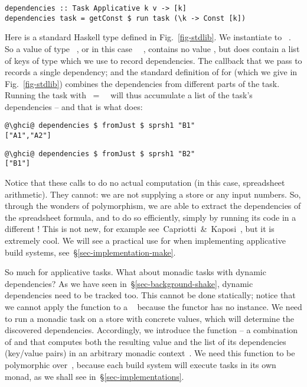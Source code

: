 \vspace{1mm}
\begin{verbatim}
dependencies :: Task Applicative k v -> [k]
dependencies task = getConst $ run task (\k -> Const [k])
\end{verbatim}
\vspace{1mm}

\noindent
Here  is a standard Haskell type defined in Fig.~\ref{fig-stdlib}. We
instantiate  to ~\hs{[@@k]}. So a value of type ~,
or in this case ~\hs{[@@k]}~, contains no value , but does
contain a list of keys of type \hs{[@@k]} which we use to record dependencies.
The  callback that we pass to  records a single dependency;
and the standard definition of  for  (which we give
in Fig.~\ref{fig-stdlib}) combines the dependencies from different parts of the
task. Running the task with ~=~~\hs{[@@k]} will thus
accumulate a list of the task's dependencies -- and that is what
 does:
\vspace{1mm}
\begin{verbatim}
@\ghci@ dependencies $ fromJust $ sprsh1 "B1"
["A1","A2"]
\end{verbatim}
\begin{verbatim}
@\ghci@ dependencies $ fromJust $ sprsh1 "B2"
["B1"]
\end{verbatim}
\vspace{1mm}

\noindent
Notice that these calls to  do no actual computation (in this
case, spreadsheet arithmetic). They cannot: we are not supplying a store or any
input numbers. So, through the wonders of polymorphism, we are able to extract
the dependencies of the spreadsheet formula, and to do so efficiently, simply by
running its code in a different ! This is not new, for example
see~Capriotti~\&~Kaposi~, but it is extremely cool.
We will see a practical use for  when implementing applicative
build systems, see~\S\ref{sec-implementation-make}.

So much for applicative tasks. What about monadic tasks with dynamic
dependencies? As we have seen in~\S\ref{sec-background-shake}, dynamic
dependencies need to be tracked too. This cannot be done statically; notice that
we cannot apply the function  to a ~ because
the  functor has no  instance. We need to run a monadic task
on a store with concrete values, which will determine the discovered
dependencies. Accordingly, we introduce the function  -- a combination
of  and  that computes both the resulting value and
the list of its dependencies (key/value pairs) in an arbitrary monadic
context~. We need this function to be polymorphic over~, because
each build system will execute tasks in its own monad, as we shall see
in~\S\ref{sec-implementations}.


